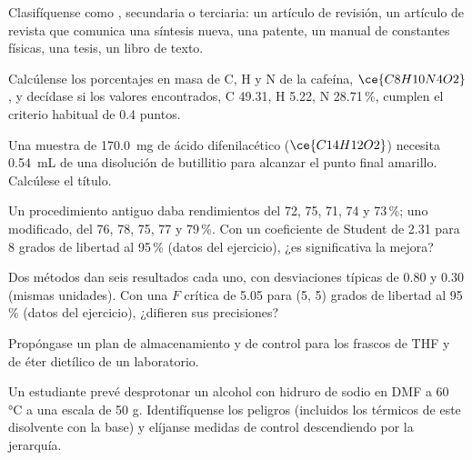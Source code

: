 \begin{exercise}[$\star$]\label{exo:b3:lab-techniques-3:4}
Clasifíquense como , secundaria o terciaria: un artículo de revisión, un
artículo de revista que comunica una síntesis nueva, una patente, un manual de constantes
físicas, una tesis, un libro de texto.
\end{exercise}

\begin{exercise}[$\star\star$]\label{exo:b3:lab-techniques-3:5}
Calcúlense los porcentajes en masa de C, H y N de la cafeína, $\ce{C8H10N4O2}$, y decídase si los valores
encontrados, C 49.31, H 5.22, N 28.71\,\%, cumplen el criterio habitual de 0.4 puntos.
\end{exercise}

\begin{exercise}[$\star\star$]\label{exo:b3:lab-techniques-3:6}
Una muestra de \qty{170.0}{mg} de ácido difenilacético ($\ce{C14H12O2}$) necesita \qty{0.54}{mL} de una disolución de butillitio para alcanzar
el punto final amarillo. Calcúlese el título.
\end{exercise}

\begin{exercise}[$\star\star$]\label{exo:b3:lab-techniques-3:7}
Un procedimiento antiguo daba rendimientos del 72, 75, 71, 74 y 73\,\%; uno modificado, del 76, 78, 75, 77 y
79\,\%. Con un coeficiente de Student de 2.31 para 8 grados de libertad al 95\,\% (datos del ejercicio),
¿es significativa la mejora?
\end{exercise}

\begin{exercise}[$\star\star$]\label{exo:b3:lab-techniques-3:8}
Dos métodos dan seis resultados cada uno, con desviaciones típicas de 0.80 y 0.30 (mismas
unidades). Con una $F$ crítica de 5.05 para (5, 5) grados de libertad al 95\,\% (datos del
ejercicio), ¿difieren sus precisiones?
\end{exercise}

\begin{exercise}[$\star\star$]\label{exo:b3:lab-techniques-3:9}
Propóngase un plan de almacenamiento y de control para los frascos de THF y de éter dietílico
de un laboratorio.
\end{exercise}

\begin{exercise}[$\star\star\star$]\label{exo:b3:lab-techniques-3:10}
Un estudiante prevé desprotonar un alcohol con hidruro de sodio en DMF a 60 °C a una
escala de 50 g. Identifíquense los peligros (incluidos los térmicos de este disolvente con
la base) y elíjanse medidas de control descendiendo por la jerarquía.
\end{exercise}

